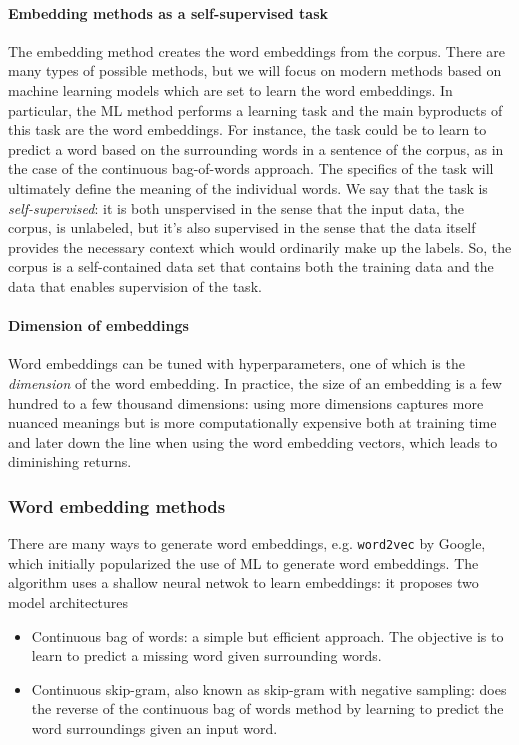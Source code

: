 \documentclass[12pt]{article}
\begin{document}
\paragraph{Embedding methods as a self-supervised task} The embedding method creates the word embeddings from the corpus. There are many types of possible methods, but we will focus on modern methods based on machine learning models which are set to learn the word embeddings. In particular, the ML method performs a learning task and the main byproducts of this task are the word embeddings. For instance, the task could be to learn to predict a word based on the surrounding words in a sentence of the corpus, as in the case of the continuous bag-of-words approach. The specifics of the task will ultimately define the meaning of the individual words. We say that the task is \emph{self-supervised}: it is both unspervised in the sense that the input data, the corpus, is unlabeled, but it's also supervised in the sense that the data itself provides the necessary context which would ordinarily make up the labels. So, the corpus is a self-contained data set that contains both the training data and the data that enables supervision of the task.

\paragraph{Dimension of embeddings}
Word embeddings can be tuned with hyperparameters, one of which is the \emph{dimension} of the word embedding. In practice, the size of an embedding is a few hundred to a few thousand dimensions: using more dimensions captures more nuanced meanings but is more computationally expensive both at training time and later down the line when using the word embedding vectors, which leads to diminishing returns.

\subsubsection{Word embedding methods} There are many ways to generate word embeddings, e.g. \texttt{word2vec} by Google, which initially popularized the use of ML to generate word embeddings. The algorithm uses a shallow neural netwok to learn embeddings: it proposes two model architectures

\begin{itemize}
\item Continuous bag of words: a simple but efficient approach. The objective is   to learn to predict a missing word given surrounding words.
\item Continuous skip-gram, also known as skip-gram with negative sampling: does the reverse of the continuous bag of words method by learning to predict the word surroundings given an input word.
\end{itemize}
\end{document}
